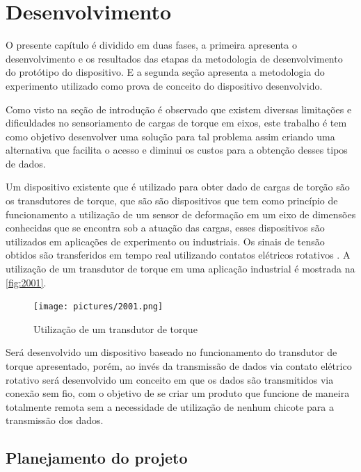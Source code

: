 
\chapter{Desenvolvimento}

O presente capítulo é dividido em duas fases, a primeira apresenta o desenvolvimento e os resultados das etapas da metodologia de desenvolvimento do protótipo do dispositivo.
E a segunda seção apresenta a metodologia do experimento utilizado como prova de conceito do dispositivo desenvolvido.

Como visto na seção de introdução é observado que existem diversas limitações e dificuldades no sensoriamento de cargas de torque em eixos, este trabalho é tem como objetivo
desenvolver uma solução para tal problema assim criando uma alternativa que facilita o acesso e diminui os custos para a obtenção desses tipos de dados.

Um dispositivo existente que é utilizado para obter dado de cargas de torção são os transdutores de torque, que são são dispositivos que tem como princípio de funcionamento
a utilização de um sensor de deformação em um eixo de dimensões conhecidas que se encontra sob a atuação das cargas, esses dispositivos são utilizados em aplicações de experimento
ou industriais.
Os sinais de tensão obtidos são transferidos em tempo real utilizando contatos elétricos rotativos \autocite{Kyowa}.
A utilização de um transdutor de torque em uma aplicação industrial é mostrada na \autoref{fig:2001}.

\begin{figure}[htb]
	\caption{\label{fig:2001} Utilização de um transdutor de torque}
	\begin{center}
		\texttt{[image: pictures/2001.png]}
	\end{center}
\end{figure}

Será desenvolvido um dispositivo baseado no funcionamento do transdutor de torque apresentado, porém, ao invés da transmissão de dados via contato elétrico rotativo será
desenvolvido um conceito em que os dados são transmitidos via conexão sem fio, com o objetivo de se criar um produto que funcione de maneira totalmente remota sem a necessidade
de utilização de nenhum chicote para a transmissão dos dados.

\section{Planejamento do projeto}


